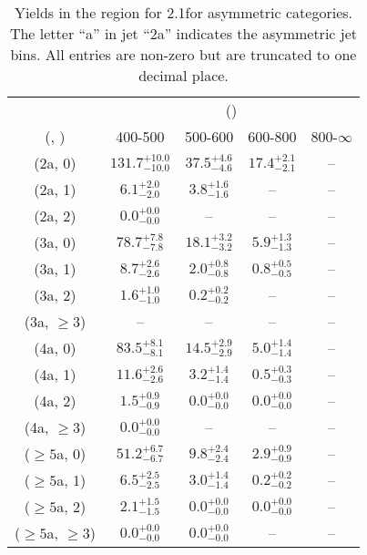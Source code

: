 \begin{table}[h!]
\tiny
\centering
\caption{Yields in the \gj region for 2.1\ifb for asymmetric categories. The letter ``a'' in jet \eg ``2a''  indicates the asymmetric jet bins. All entries are non-zero but are truncated to one decimal place.\label{tab:yieldsnodata_gj_comb_asym}}
\begin{tabular}
{ccccc}
	\hline\hline
	& \multicolumn{4}{c}{\scalht (\gev)} \\ 
	 (\njet,  \nb) & 400-500 & 500-600 & 600-800 & 800-$\infty$ \\ [0.8ex] 
\hline
	(2a, 0) & $131.7^{+ 10.0 }_{- 10.0 }$ & $37.5^{+ 4.6 }_{- 4.6 }$ & $17.4^{+ 2.1 }_{- 2.1 }$ & -- \\[0.5ex] 
	(2a, 1) & $6.1^{+ 2.0 }_{- 2.0 }$ & $3.8^{+ 1.6 }_{- 1.6 }$ & -- & -- \\[0.5ex] 
	(2a, 2) & $0.0^{+ 0.0 }_{- 0.0 }$ & -- & -- & -- \\[0.5ex] 
	(3a, 0) & $78.7^{+ 7.8 }_{- 7.8 }$ & $18.1^{+ 3.2 }_{- 3.2 }$ & $5.9^{+ 1.3 }_{- 1.3 }$ & -- \\[0.5ex] 
	(3a, 1) & $8.7^{+ 2.6 }_{- 2.6 }$ & $2.0^{+ 0.8 }_{- 0.8 }$ & $0.8^{+ 0.5 }_{- 0.5 }$ & -- \\[0.5ex] 
	(3a, 2) & $1.6^{+ 1.0 }_{- 1.0 }$ & $0.2^{+ 0.2 }_{- 0.2 }$ & -- & -- \\[0.5ex] 
	(3a, $\ge3$) & -- & -- & -- & -- \\[0.5ex] 
	(4a, 0) & $83.5^{+ 8.1 }_{- 8.1 }$ & $14.5^{+ 2.9 }_{- 2.9 }$ & $5.0^{+ 1.4 }_{- 1.4 }$ & -- \\[0.5ex] 
	(4a, 1) & $11.6^{+ 2.6 }_{- 2.6 }$ & $3.2^{+ 1.4 }_{- 1.4 }$ & $0.5^{+ 0.3 }_{- 0.3 }$ & -- \\[0.5ex] 
	(4a, 2) & $1.5^{+ 0.9 }_{- 0.9 }$ & $0.0^{+ 0.0 }_{- 0.0 }$ & $0.0^{+ 0.0 }_{- 0.0 }$ & -- \\[0.5ex] 
	(4a, $\ge3$) & $0.0^{+ 0.0 }_{- 0.0 }$ & -- & -- & -- \\[0.5ex] 
	($\ge5$a, 0) & $51.2^{+ 6.7 }_{- 6.7 }$ & $9.8^{+ 2.4 }_{- 2.4 }$ & $2.9^{+ 0.9 }_{- 0.9 }$ & -- \\[0.5ex] 
	($\ge5$a, 1) & $6.5^{+ 2.5 }_{- 2.5 }$ & $3.0^{+ 1.4 }_{- 1.4 }$ & $0.2^{+ 0.2 }_{- 0.2 }$ & -- \\[0.5ex] 
	($\ge5$a, 2) & $2.1^{+ 1.5 }_{- 1.5 }$ & $0.0^{+ 0.0 }_{- 0.0 }$ & $0.0^{+ 0.0 }_{- 0.0 }$ & -- \\[0.5ex] 
	($\ge5$a, $\ge3$) & $0.0^{+ 0.0 }_{- 0.0 }$ & $0.0^{+ 0.0 }_{- 0.0 }$ & -- & -- \\[0.5ex] 
	\hline
	\hline
\end{tabular}
\end{table}
